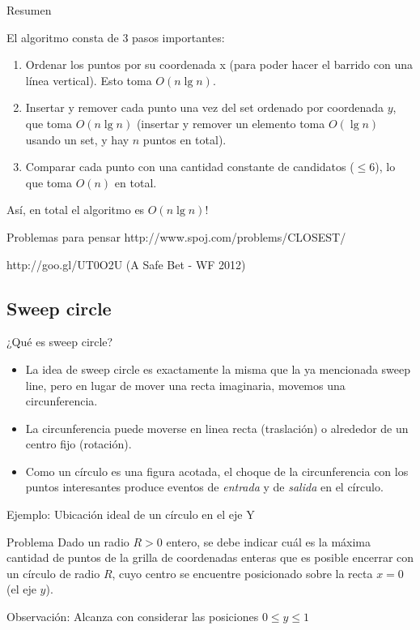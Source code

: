 \documentclass[compress]{beamer}
\begin{document}
\begin{frame}{Resumen}

El algoritmo consta de 3 pasos importantes:

\begin{enumerate}
\item Ordenar los puntos por su coordenada x (para poder hacer el barrido con una l\'inea vertical). Esto toma $O(n \lg n)$.
\item Insertar y remover cada punto una vez del set ordenado por coordenada $y$, que toma $O(n \lg n)$ (insertar y remover un elemento toma $O(\lg n)$ usando un set, y hay $n$ puntos en total).
\item Comparar cada punto con una cantidad constante de candidatos ($\leq 6$), lo que toma $O(n)$ en total.
\end{enumerate}
   
As\'i, en total el algoritmo es $O(n \lg n)$!
\end{frame}

\begin{frame}{Problemas para pensar}
http://www.spoj.com/problems/CLOSEST/

http://goo.gl/UT0O2U (A Safe Bet - WF 2012)
\end{frame}

\subsection{Sweep circle}

\begin{frame}{¿Qu\'e es sweep circle?}
\begin{itemize}
\item La idea de sweep circle es exactamente la misma que la ya mencionada sweep line, pero en lugar de mover una recta imaginaria, movemos una circunferencia.

\item La circunferencia puede moverse en linea recta (traslación) o alrededor de un centro fijo (rotación).

\item Como un círculo es una figura acotada, el choque de la circunferencia con los puntos interesantes produce eventos de \textit{entrada} y de \textit{salida} en el círculo.
\end{itemize}
\end{frame}

\begin{frame}{Ejemplo: Ubicación ideal de un círculo en el eje Y}

\begin{block}{Problema}
    Dado un radio $R > 0$ entero, se debe indicar cuál es la máxima cantidad de puntos de la grilla de coordenadas enteras que es posible encerrar con un círculo de radio $R$, cuyo centro se encuentre posicionado sobre la recta $x=0$ (el eje $y$).
\end{block}

\pause
{}
{
    Observación: Alcanza con considerar las posiciones $0 \leq y \leq 1$
}

\end{frame}
\end{document}
